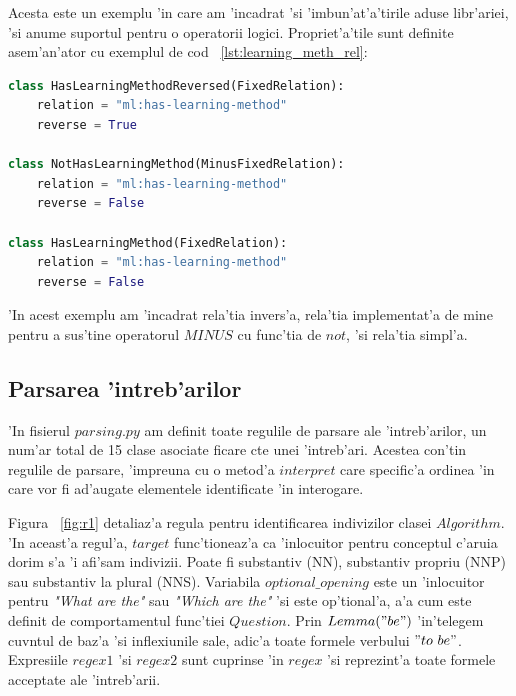 \documentclass[12pt,a4paper,twoside]{report}
\begin{document}
Acesta este un exemplu 'in care am 'incadrat 'si 'imbun'at'a'tirile aduse libr'ariei, 'si anume suportul pentru o operatorii logici. Propriet'a'tile sunt definite asem'an'ator cu exemplul de cod ~\ref{lst:learning_meth_rel}:

\begin{lstlisting}[basicstyle=\footnotesize, language = Python, label = lst:learning_meth_rel, caption = Proprietatea has-learning-method]
class HasLearningMethodReversed(FixedRelation):
    relation = "ml:has-learning-method"
    reverse = True

class NotHasLearningMethod(MinusFixedRelation):
    relation = "ml:has-learning-method"
    reverse = False

class HasLearningMethod(FixedRelation):
    relation = "ml:has-learning-method"
    reverse = False

\end{lstlisting}

'In acest exemplu am 'incadrat rela'tia invers'a, rela'tia implementat'a de mine pentru a sus'tine operatorul $MINUS$ cu func'tia de $not$, 'si rela'tia simpl'a.


\subsection{Parsarea 'intreb'arilor}
\label{sec:parse}

'In fisierul $parsing.py$ am definit toate regulile de parsare ale 'intreb'arilor, un num'ar total de 15 clase asociate ficare c\ia te unei 'intreb'ari. Acestea con'tin regulile de parsare, 'impreuna cu o metod'a $interpret$ care specific'a ordinea 'in care vor fi ad'augate elementele identificate 'in interogare.

Figura ~\ref{fig:r1} detaliaz'a regula pentru identificarea indivizilor clasei $Algorithm$. 'In aceast'a regul'a, $target$ func'tioneaz'a ca 'inlocuitor pentru conceptul c'aruia dorim s'a 'i afi'sam indivizii. Poate fi substantiv (NN), substantiv propriu (NNP) sau substantiv la plural (NNS). Variabila $optional\_opening$ este un 'inlocuitor pentru {\it"What are the"} sau {\it"Which are the"} 'si este op'tional'a, a'a cum este definit de comportamentul func'tiei $Question$. Prin $Lemma("be")$ 'in'telegem cuv\ia ntul de baz'a 'si inflexiunile sale, adic'a toate formele verbului $"to\ be"$.
Expresiile $regex1$ 'si $regex2$ sunt cuprinse 'in $regex$ 'si reprezint'a toate formele acceptate ale 'intreb'arii.
\end{document}
